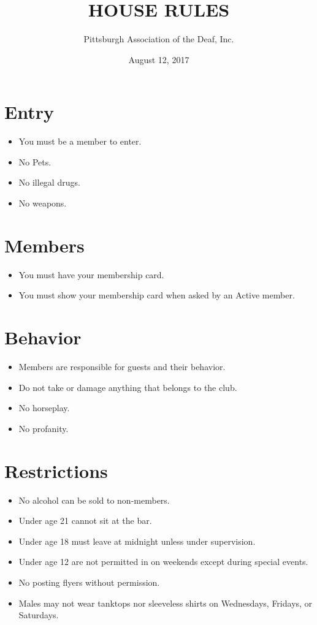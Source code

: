 \documentclass[12pt,letterpaper]{article}
\title{HOUSE RULES}
\author{Pittsburgh Association of the Deaf, Inc.}
\date{August 12, 2017}
\begin{document}
\maketitle

\section*{Entry}
\begin{itemize}
\item You must be a member to enter.
\item No Pets.
\item No illegal drugs.
\item No weapons.
\end{itemize}

\section*{Members}
\begin{itemize}
\item You must have your membership card.
\item You must show your membership card when asked by an Active member.
\end{itemize}

\section*{Behavior}
\begin{itemize}
\item Members are responsible for guests and their behavior.
\item Do not take or damage anything that belongs to the club.
\item No horseplay.
\item No profanity.
\end{itemize}

\section*{Restrictions}
\begin{itemize}
\item No alcohol can be sold to non-members.
\item Under age 21 cannot sit at the bar.
\item Under age 18 must leave at midnight unless under supervision.
\item Under age 12 are not permitted in on weekends except during special events.
\item No posting flyers without permission.
\item Males may not wear tanktops nor sleeveless shirts on Wednesdays, Fridays, or Saturdays.
\end{itemize}
\end{document}
